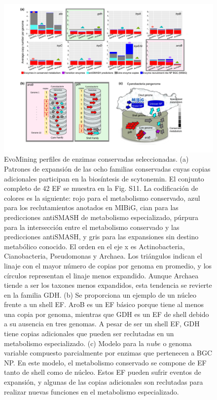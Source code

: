 \documentclass[12pt,twoside]{reedthesis}
\begin{document}
  \begin{figure}[h!tbp]
  \centering
  \includegraphics[angle = 0,scale = .6]{chapter2/FigurasPaper/Figure3.pdf}
  \caption[Expansion patterns in 42 conserved families]{\footnotesize{EvoMining perfiles de enzimas conservadas seleccionadas. (a) Patrones de expansión de las ocho familias conservadas cuyas copias adicionales participan en la biosíntesis de scytonemin. El conjunto completo de 42 EF se muestra en la Fig. S11. La codificación de colores es la siguiente: rojo para el metabolismo conservado, azul para los reclutamientos anotados en MIBiG, cian para las predicciones antiSMASH de metabolismo especializado, púrpura para la intersección entre el metabolismo conservado y las predicciones antiSMASH, y gris para las expansiones sin destino metabólico conocido. El orden en el eje x es Actinobacteria, Cianobacteria, Pseudomonas y Archaea. Los triángulos indican el linaje con el mayor número de copias por genoma en promedio, y los círculos representan el linaje menos expandido. Aunque Archaea tiende a ser los taxones menos expandidos, esta tendencia se revierte en la familia GDH. (b) Se proporciona un ejemplo de un núcleo frente a un shell EF. AroB es un EF básico porque tiene al menos una copia por genoma, mientras que GDH es un EF de shell debido a su ausencia en tres genomas. A pesar de ser un shell EF, GDH tiene copias adicionales que pueden ser reclutadas en un metabolismo especializado. (c) Modelo para la $nube$ o genoma variable compuesto parcialmente por enzimas que pertenecen a BGC NP. En este modelo, el metabolismo conservado se compone de EF tanto de shell como de núcleo. Estos EF pueden sufrir eventos de expansión, y algunas de las copias adicionales son reclutadas para realizar nuevas funciones en el metabolismo especializado.}}
  \label{fig:ExpansionPatterns}
  \end{figure}
  
\end{document}
